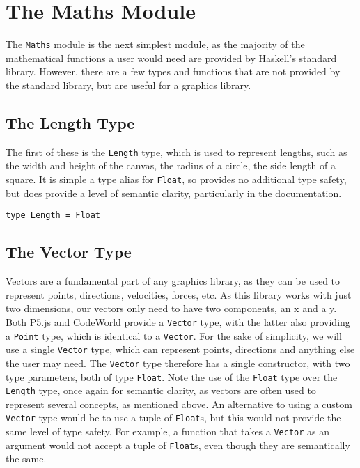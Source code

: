 \documentclass[../main.tex]{subfiles}
\begin{document}
    \section{The Maths Module}
        The \verb|Maths| module is the next simplest module, as the majority of the
            mathematical functions a user would need are provided by Haskell's standard
            library.
        However, there are a few types and functions that are not provided by the
            standard library, but are useful for a graphics library.

        \subsection{The Length Type}
            The first of these is the \verb|Length| type, which is used to represent
                lengths, such as the width and height of the canvas, the radius of a circle,
                the side length of a square.
            It is simple a type alias for \verb|Float|, so provides no additional type
                safety, but does provide a level of semantic clarity, particularly in the
                documentation.
            \begin{lstlisting}[label={lst:length}, caption={The Length type definition.}]
type Length = Float\end{lstlisting}

        \subsection{The Vector Type}
            Vectors are a fundamental part of any graphics library, as they can be used to
                represent points, directions, velocities, forces, etc. As this library works
                with just two dimensions, our vectors only need to have two components, an x
                and a y.
            Both P5.js and CodeWorld provide a \verb|Vector| type, with the latter also
                providing a \verb|Point| type, which is identical to a \verb|Vector|.
            For the sake of simplicity, we will use a single \verb|Vector| type, which can
                represent points, directions and anything else the user may need.
            The \verb|Vector| type therefore has a single constructor, with two type
                parameters, both of type \verb|Float|.
            Note the use of the \verb|Float| type over the \verb|Length| type, once again
                for semantic clarity, as vectors are often used to represent several concepts,
                as mentioned above.
            An alternative to using a custom \verb|Vector| type would be to use a tuple of
                \verb|Float|s, but this would not provide the same level of type safety.
            For example, a function that takes a \verb|Vector| as an argument would not
                accept a tuple of \verb|Float|s, even though they are semantically the same.
\end{document}
